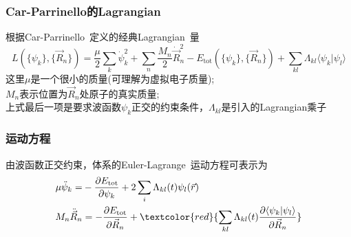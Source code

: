{\frame
{
	\frametitle{\textrm{Car-Parrinello}的\textrm{Lagrangian}}
	根据\textrm{Car-Parrinello~}定义的经典\textrm{Lagrangian~}量
	{\fontsize{9.0pt}{5.2pt}\selectfont
	\begin{displaymath}
		L(\{\psi_k\},\{\vec R_n\})=\frac{\mu}2\sum_k\dot{\psi}_k^2+\sum_n\frac{M_n}2\dot{\vec R}_n^2-E_{\mathrm{tot}}(\{\psi_k\},\{\vec R_n\})+\sum_{kl}\Lambda_{kl}\langle\psi_k|\psi_l\rangle
	\end{displaymath}}
	这里$\mu$是一个很小的质量(可理解为虚拟电子质量);\\
	$M_n$表示位置为$\vec R_n$处原子的真实质量;~\\
	上式最后一项是要求波函数$\psi_k$正交的约束条件，$\Lambda_{kl}$是引入的\textrm{Lagrangian}乘子
\vskip 5pt
{\fontsize{7.2pt}{5.2pt}}
}

\frame
{
	\frametitle{运动方程}
由波函数正交约束，体系的\textrm{Euler-Lagrange~}运动方程可表示为
	\begin{displaymath}
		\begin{aligned}
			\mu\ddot{\psi}_k=&-\dfrac{\partial E_{\mathrm{tot}}}{\partial\psi_k}+2\sum_i\Lambda_{kl}(t)\psi_l(\vec r)\\
			M_n\ddot{\vec R}_n&=-\dfrac{\partial E_{\mathrm{tot}}}{\partial\vec R_n}+\textcolor{red}{\sum_{kl}\Lambda_{kl}(t)\dfrac{\partial\langle\psi_k|\psi_l\rangle}{\partial\vec R_n}}
		\end{aligned}
	\end{displaymath}
	{\fontsize{7.2pt}{5.2pt}}
}

}
